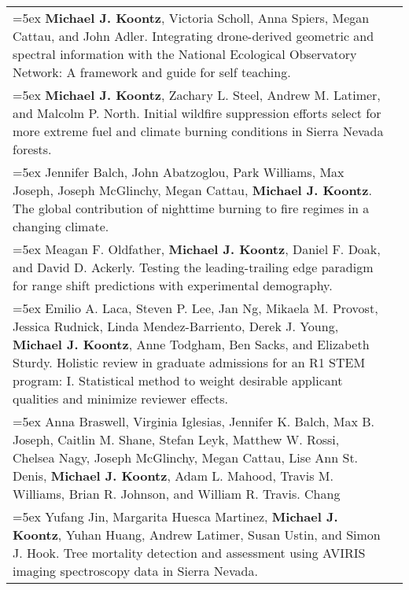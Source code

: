 \begin{longtable}{@{} >{\raggedright}p{5.25in} >{\raggedleft}X @{}}

\hangindent=5ex \textbf{Michael J. Koontz}, Victoria Scholl, Anna Spiers, Megan Cattau, and John Adler. Integrating drone-derived geometric and spectral information with the National Ecological Observatory Network: A framework and guide for self teaching. & [\textcolor{blue}{\href{https://github.com/mikoontz/neon-drone-workflow}{GitHub}}] \tabularnewline

\hangindent=5ex \textbf{Michael J. Koontz}, Zachary L. Steel, Andrew M. Latimer, and Malcolm P. North. Initial wildfire suppression efforts select for more extreme fuel and climate burning conditions in Sierra Nevada forests.  & [\textcolor{blue}{\href{https://github.com/mikoontz/selection-by-suppression}{GitHub}}] \tabularnewline

\hangindent=5ex Jennifer Balch, John Abatzoglou, Park Williams, Max Joseph, Joseph McGlinchy, Megan Cattau, \textbf{Michael J. Koontz}. The global contribution of nighttime burning to fire regimes in a changing climate. & \tabularnewline

\hangindent=5ex Meagan F. Oldfather, \textbf{Michael J. Koontz}, Daniel F. Doak, and David D. Ackerly. Testing the leading-trailing edge paradigm for range shift predictions with experimental demography. & \tabularnewline

\hangindent=5ex Emilio A. Laca, Steven P. Lee, Jan Ng, Mikaela M. Provost, Jessica Rudnick, Linda Mendez-Barriento, Derek J. Young, \textbf{Michael J. Koontz}, Anne Todgham, Ben Sacks, and Elizabeth Sturdy. Holistic review in graduate admissions for an R1 STEM program: I. Statistical method to weight desirable applicant qualities and minimize reviewer effects. & \tabularnewline

\hangindent=5ex Anna Braswell, Virginia Iglesias, Jennifer K. Balch, Max B. Joseph, Caitlin M. Shane, Stefan Leyk, Matthew W. Rossi, Chelsea Nagy, Joseph McGlinchy, Megan Cattau, Lise Ann St. Denis, \textbf{Michael J. Koontz}, Adam L. Mahood, Travis M. Williams, Brian R. Johnson, and William R. Travis. Chang\tabularnewline

\hangindent=5ex Yufang Jin, Margarita Huesca Martinez, \textbf{Michael J. Koontz}, Yuhan Huang, Andrew Latimer, Susan Ustin, and Simon J. Hook. Tree mortality detection and assessment using AVIRIS imaging spectroscopy data in Sierra Nevada. &


\end{longtable}


